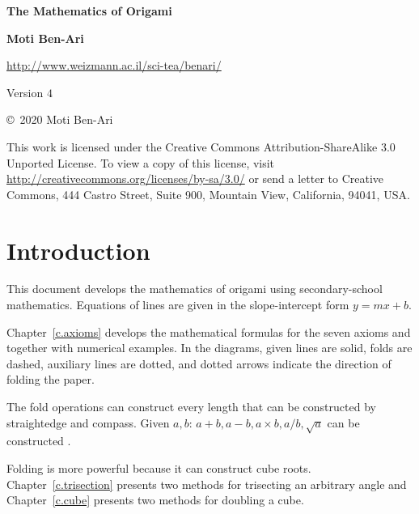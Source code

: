
\thispagestyle{empty}

\begin{center}
\textbf{\LARGE The Mathematics of Origami}

\bigskip
\bigskip

\textbf{\Large Moti Ben-Ari}

\bigskip
\bigskip

\url{http://www.weizmann.ac.il/sci-tea/benari/}

\bigskip
\bigskip

Version $4$
\end{center}

\vfill

\begin{small}
\begin{center}
\copyright{}\ 2020 Moti Ben-Ari
\end{center}

This work is licensed under the Creative Commons Attribution-ShareAlike 3.0 Unported License. To view a copy of this license, visit \url{http://creativecommons.org/licenses/by-sa/3.0/} or send a letter to Creative Commons, 444 Castro Street, Suite 900, Mountain View, California, 94041, USA.
\end{small}

\tableofcontents



\chapter{Introduction}\label{c.introduction}

This document develops the mathematics of origami using secondary-school mathematics. Equations of lines are given in the slope-intercept form $y=mx+b$.

Chapter~\ref{c.axioms} develops the mathematical formulas for the seven axioms and together with numerical examples. In the diagrams, given lines are solid, folds are dashed, auxiliary lines are dotted, and dotted arrows indicate the direction of folding the paper.

The fold operations can construct every length that can be constructed by straightedge and compass. Given $a,b$: $a+b, a-b, a\times b, a/b, \sqrt{a}$ can be constructed \cite[Chapter~4]{hwa}.

Folding is more powerful because it can construct cube roots. Chapter~\ref{c.trisection} presents two methods for trisecting an arbitrary angle and Chapter~\ref{c.cube} presents two methods for doubling a cube.

